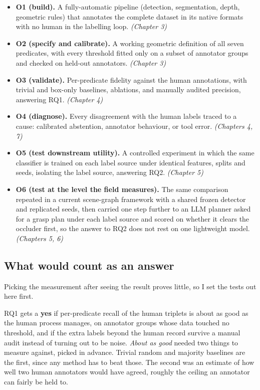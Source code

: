 \begin{itemize}
\item \textbf{O1 (build).} A fully-automatic pipeline (detection, segmentation, depth, geometric rules) that annotates the complete dataset in its native formats with no human in the labelling loop. \textit{(Chapter 3)}
\item \textbf{O2 (specify and calibrate).} A working geometric definition of all seven predicates, with every threshold fitted only on a subset of annotator groups and checked on held-out annotators. \textit{(Chapter 3)}
\item \textbf{O3 (validate).} Per-predicate fidelity against the human annotations, with trivial and box-only baselines, ablations, and manually audited precision, answering RQ1. \textit{(Chapter 4)}
\item \textbf{O4 (diagnose).} Every disagreement with the human labels traced to a cause: calibrated abstention, annotator behaviour, or tool error. \textit{(Chapters 4, 7)}
\item \textbf{O5 (test downstream utility).} A controlled experiment in which the same classifier is trained on each label source under identical features, splits and seeds, isolating the label source, answering RQ2. \textit{(Chapter 5)}
\item \textbf{O6 (test at the level the field measures).} The same comparison repeated in a current scene-graph framework with a shared frozen detector and replicated seeds, then carried one step further to an LLM planner asked for a grasp plan under each label source and scored on whether it clears the occluder first, so the answer to RQ2 does not rest on one lightweight model. \textit{(Chapters 5, 6)}
\end{itemize}

\subsection{What would count as an answer}

Picking the measurement after seeing the result proves little, so I set the tests out here first.

RQ1 gets a \textbf{yes} if per-predicate recall of the human triplets is about as good as the human process manages, on annotator groups whose data touched no threshold, and if the extra labels beyond the human record survive a manual audit instead of turning out to be noise. \textit{About as good} needed two things to measure against, picked in advance. Trivial random and majority baselines are the first, since any method has to beat those. The second was an estimate of how well two human annotators would have agreed, roughly the ceiling an annotator can fairly be held to.

